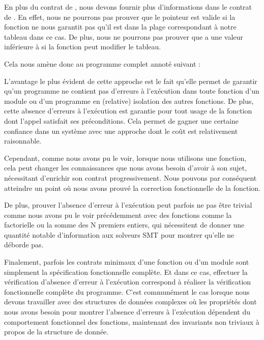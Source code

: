 En plus du contrat de , nous devons fournir plus d'informations
dans le contrat de . En effet, nous ne pourrons pas prouver
que le pointeur est valide si la fonction ne nous garantit
pas qu'il est dans la plage correspondant à notre tableau dans ce cas. De plus,
nous ne pourrons pas prouver que  a une valeur inférieure à
 si la fonction peut modifier le tableau.


Cela nous amène donc au programme complet annoté suivant :






L'avantage le plus évident de cette approche est le fait qu'elle permet de garantir
qu'un programme ne contient pas d'erreurs à l'exécution dans toute fonction d'un
module ou d'un programme en (relative) isolation des autres fonctions. De plus,
cette absence d'erreurs à l'exécution est garantie pour tout usage de la fonction
dont l'appel satisfait ses préconditions. Cela permet de gagner une certaine
confiance dans un système avec une approche dont le coût est relativement
raisonnable.



Cependant, comme nous avons pu le voir, lorsque nous utilisons une fonction, cela
peut changer les connaissances que nous avons besoin d'avoir à son sujet, nécessitant
d'enrichir son contrat progressivement. Nous pouvons par conséquent atteindre un
point où nous avons prouvé la correction fonctionnelle de la fonction.



De plus, prouver l'absence d'erreur à l'exécution peut parfois ne pas être trivial
comme nous avons pu le voir précédemment avec des fonctions comme la factorielle ou
la somme des N premiers entiers, qui nécessitent de donner une quantité notable
d'information aux solveurs SMT pour montrer qu'elle ne déborde pas.



Finalement, parfois les contrats minimaux d'une fonction ou d'un module sont
simplement la spécification fonctionnelle complète. Et dans ce cas, effectuer la
vérification d'absence d'erreur à l'exécution correspond à réaliser la vérification
fonctionnelle complète du programme. C'est communément le cas lorsque nous devons
travailler avec des structures de données complexes où les propriétés dont nous
avons besoin pour montrer l'absence d'erreurs à l'exécution dépendent du
comportement fonctionnel des fonctions, maintenant des invariants non triviaux
à propos de la structure de donnée.


